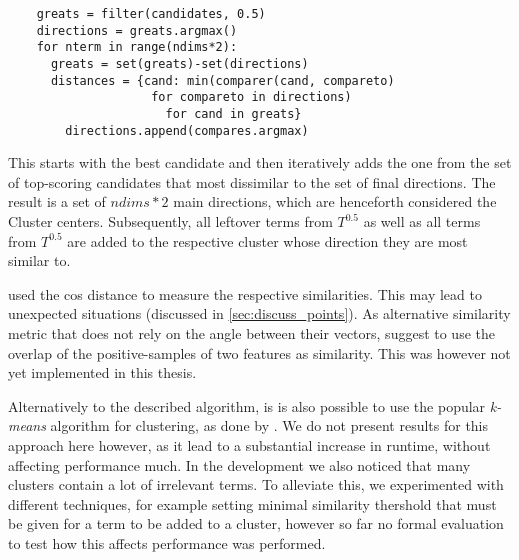 \vspace{-1ex}
\begingroup
\verbatimfont{\footnotesize}%
\begin{verbatim}
	greats = filter(candidates, 0.5)
	directions = greats.argmax()
	for nterm in range(ndims*2):
	  greats = set(greats)-set(directions)
	  distances = {cand: min(comparer(cand, compareto) 
	                for compareto in directions) 
	                  for cand in greats}
		directions.append(compares.argmax)
\end{verbatim}
\endgroup
\vspace{-1ex}

This starts with the best candidate and then iteratively adds the one from the set of top-scoring candidates that most dissimilar to the set of final directions. The result is a set of $ndims*2$ main directions, which are henceforth considered the Cluster centers. Subsequently, all leftover terms from $T^{0.5}$ as well as all terms from $T^{0.5}$ are added to the respective cluster whose direction they are most similar to. 

\textcite{Derrac2015} used the \gls{cos} distance to measure the respective similarities. This may lead to unexpected situations (discussed in \autoref{sec:discuss_points}). As alternative similarity metric that does not rely on the angle between their vectors, \cite{Alshaikh2019} suggest to use the overlap of the positive-samples of two features as similarity. This was however not yet implemented in this thesis.

Alternatively to the described algorithm, is is also possible to use the popular \textit{k-means} algorithm for clustering, as done by \cite{Ager2018}. We do not present results for this approach here however, as it lead to a substantial increase in runtime, without affecting performance much. In the development we also noticed that many clusters contain a lot of irrelevant terms. To alleviate this, we experimented with different techniques, for example setting minimal similarity thershold that must be given for a term to be added to a cluster, however so far no formal evaluation to test how this affects performance was performed.


